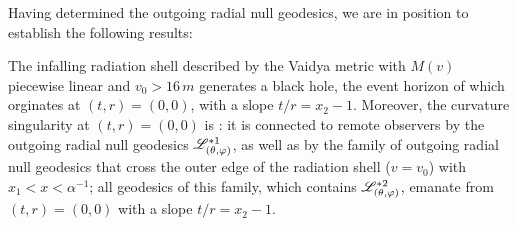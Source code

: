 Having determined the outgoing radial null geodesics, we are in position to establish
the following results:
\begin{greybox}
The infalling radiation shell described by the Vaidya metric with $M(v)$ piecewise linear
and $v_0 > 16\,  m$ generates a black hole, the event horizon of which orginates
at $(t,r) = (0, 0)$, with a slope $t/r = x_2 - 1$. Moreover, the curvature singularity at $(t,r)=(0,0)$
is : it is connected to remote observers
by the outgoing radial null geodesics $\mathscr{L}^{*1}_{(\theta,\varphi)}$, as well as
by the family of outgoing radial
null geodesics that cross the outer edge of the radiation shell ($v=v_0$) with
$x_1 < x < \alpha^{-1}$; all geodesics of this family, which contains
$\mathscr{L}^{*2}_{(\theta,\varphi)}$, emanate from $(t,r)=(0,0)$ with a slope $t/r = x_2 - 1$.
\end{greybox}
